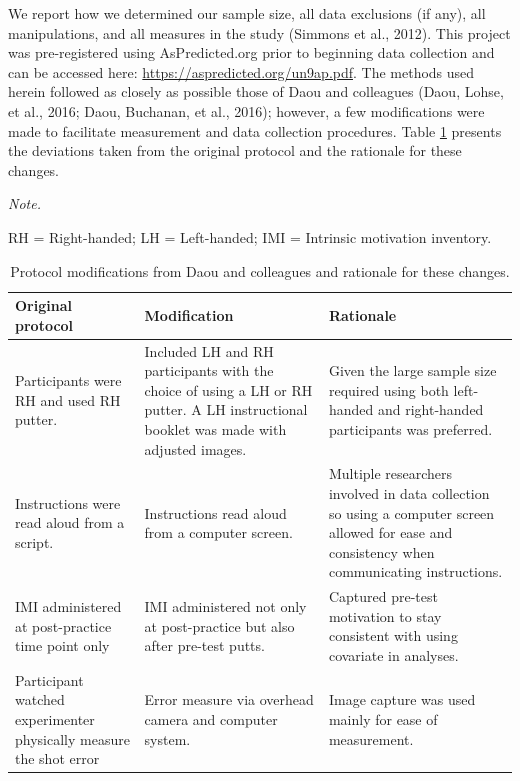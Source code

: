 \documentclass[
  english,
  man,floatsintext]{apa7}
\begin{document}
We report how we determined our sample size, all data exclusions (if any), all manipulations, and all measures in the study (Simmons et al., 2012). This project was pre-registered using AsPredicted.org prior to beginning data collection and can be accessed here: \url{https://aspredicted.org/un9ap.pdf}. The methods used herein followed as closely as possible those of Daou and colleagues (Daou, Lohse, et al., 2016; Daou, Buchanan, et al., 2016); however, a few modifications were made to facilitate measurement and data collection procedures. Table \ref{tab:table1} presents the deviations taken from the original protocol and the rationale for these changes.

\begingroup\fontsize{11}{13}\selectfont

\begin{landscape}
\begin{ThreePartTable}
\begin{TableNotes}
\item \textit{Note.} 
\item RH = Right-handed; LH = Left-handed; IMI = Intrinsic motivation inventory.
\end{TableNotes}
\begin{longtable}[l]{>{\raggedright\arraybackslash}p{13em}>{\raggedright\arraybackslash}p{20em}>{\raggedright\arraybackslash}p{20em}}
\caption{\label{tab:table1}Protocol modifications from Daou and colleagues and rationale for these changes.}\\
\toprule
Original protocol & Modification & Rationale\\
\midrule
Participants were RH and used RH putter. & Included LH and RH participants with the choice of using a LH or RH putter. A LH instructional booklet was made with adjusted images. & Given the large sample size required using both left-handed and right-handed participants was preferred.\\
\addlinespace
Instructions were read aloud from a script. & Instructions read aloud from a computer screen. & Multiple researchers involved in data collection so using a computer screen allowed for ease and consistency when communicating instructions.\\
\addlinespace
IMI administered at post-practice time point only & IMI administered not only at post-practice but also after pre-test putts. & Captured pre-test motivation to stay consistent with using covariate in analyses.\\
\addlinespace
Participant watched experimenter physically measure the shot error & Error measure via overhead camera and computer system. & Image capture was used mainly for ease of measurement.\\

\end{longtable}
\end{ThreePartTable}
\end{landscape}
\end{document}
